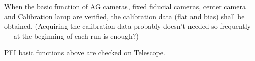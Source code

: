 When the basic function of AG cameras, fixed fiducial cameras, center camera and Calibration lamp are verified, the calibration data (flat and bias) shall be obtained.
(Acquiring the calibration data probably doesn't needed so frequently --- at the beginning of each run is enough?)

\begin{itembox}[l]{}
PFI basic functions above are checked on Telescope. 

\end{itembox}